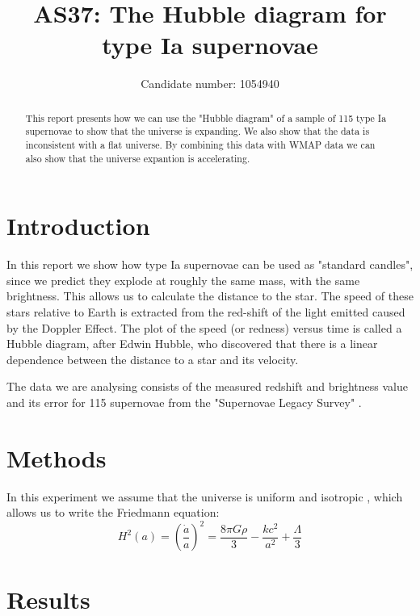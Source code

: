 \documentclass[11pt]{article}
\title{AS37: The Hubble diagram for type Ia supernovae}
\author{Candidate number: 1054940}
\begin{document}
\maketitle


\begin{abstract}
This report presents how we can use the "Hubble diagram" of a sample of 115 type Ia supernovae to show that the universe is expanding. We also show that the data is inconsistent with a flat universe. By combining this data with WMAP data we can also show that the universe expantion is accelerating. 
\end{abstract}


\section{Introduction}
In this report we show how type Ia supernovae can be used as "standard candles", since we predict they explode at roughly the same mass, with the same brightness. This allows us to calculate the distance to the star. The speed of these stars relative to Earth is extracted from the red-shift of the light emitted caused by the Doppler Effect. The plot of the speed (or redness) versus time is called a Hubble diagram, after Edwin Hubble, who discovered that there is a linear dependence between the distance to a star and its velocity. 

The data we are analysing consists of the measured redshift and brightness value and its error for 115 supernovae from the "Supernovae Legacy Survey" \cite{SN_legacy_survey}. 


\section{Methods}
In this experiment we assume that the universe is uniform and isotropic \cite{AS37_lab_script}, which allows us to write the Friedmann equation: 
\begin{equation}
	H^2(a) = \left( \frac{\dot{a}}{a} \right)^2 = \frac{8 \pi G \rho}{3} - \frac{kc^2}{a^2} + \frac{\Lambda}{3}
\end{equation}

\section{Results}
\end{document}
